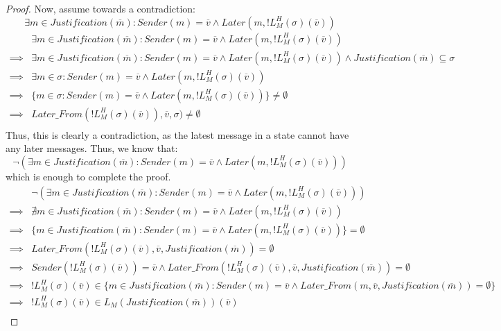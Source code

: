 \begin{proof}
Now, assume towards a contradiction:
$$
\exists m \in Justification(\overline{m}): Sender(m) = \overline{v} \land Later(m, !L^H_M(\sigma)(\overline{v}))
$$
\begin{align}
  &\exists m \in Justification(\overline{m}): Sender(m) = \overline{v} \land Later(m, !L^H_M(\sigma)(\overline{v})) \\
  \implies& \exists m \in Justification(\overline{m}): Sender(m) = \overline{v} \land Later(m, !L^H_M(\sigma)(\overline{v})) \land Justification(\overline{m}) \subseteq \sigma \\
  \implies& \exists m \in \sigma: Sender(m) = \overline{v} \land Later(m, !L^H_M(\sigma)(\overline{v})) \\
  \implies& \{m \in \sigma : Sender(m) = \overline{v} \land Later(m, !L^H_M(\sigma)(\overline{v}))\} \neq \emptyset \\
  \implies& Later\_From(!L^H_M(\sigma)(\overline{v})), \overline{v}, \sigma) \neq \emptyset \\
\end{align}
Thus, this is clearly a contradiction, as the latest message in a state cannot have any later messages. Thus, we know that:
$$
\neg (\exists m \in Justification(\overline{m}): Sender(m) = \overline{v} \land Later(m, !L^H_M(\sigma)(\overline{v})))
$$
which is enough to complete the proof.
\begin{align}
          &\neg (\exists m \in Justification(\overline{m}): Sender(m) = \overline{v} \land Later(m, !L^H_M(\sigma)(\overline{v}))) \\
  \implies&\nexists m \in Justification(\overline{m}): Sender(m) = \overline{v} \land Later(m, !L^H_M(\sigma)(\overline{v})) \\
  \implies&\{m \in Justification(\overline{m}) : Sender(m) = \overline{v} \land  Later(m, !L^H_M(\sigma)(\overline{v}))\} = \emptyset \\
  \implies&Later\_From(!L^H_M(\sigma)(\overline{v}), \overline{v}, Justification(\overline{m})) = \emptyset \\
  \implies&Sender(!L^H_M(\sigma)(\overline{v})) = \overline{v} \land Later\_From(!L^H_M(\sigma)(\overline{v}), \overline{v}, Justification(\overline{m})) = \emptyset \\
  \implies&!L^H_M(\sigma)(\overline{v}) \in \{m \in Justification(\overline{m}) : Sender(m) = \overline{v} \land Later\_From(m, \overline{v}, Justification(\overline{m})) = \emptyset\} \\
  \implies&!L^H_M(\sigma)(\overline{v}) \in L_M(Justification(\overline{m}))(\overline{v}) \\

\end{align}
\end{proof}
